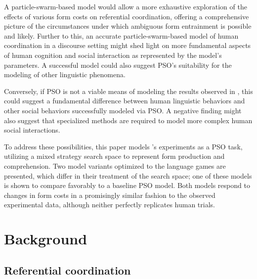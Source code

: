 \documentclass[11pt]{article}
\begin{document}
A particle-swarm-based model would allow a more exhaustive exploration of the effects of various form costs on referential coordination, offering a comprehensive picture of the circumstances under which ambiguous form entrainment is possible and likely. Further to this, an accurate particle-swarm-based model of human coordination in a discourse setting might shed light on more fundamental aspects of human cognition and social interaction as represented by the model's parameters. A successful model could also suggest PSO's suitability for the modeling of other linguistic phenomena. 

Conversely, if PSO is not a viable means of modeling the results observed in \citeauthor{rohde2012}, this could suggest a fundamental difference between human linguistic behaviors and other social behaviors successfully modeled via PSO. A negative finding might also suggest that specialized methods are required to model more complex human social interactions.

To address these possibilities, this paper models \citeauthor{rohde2012}'s experiments as a PSO task, utilizing a mixed strategy search space to represent form production and comprehension. Two model variants optimized to the \citeauthor{rohde2012} language games are presented, which differ in their treatment of the search space; one of these models is shown to compare favorably to a baseline PSO model. Both models respond to changes in form costs in a promisingly similar fashion to the observed experimental data, although neither perfectly replicates human trials.


\section{Background}
\subsection{Referential coordination}
\end{document}
